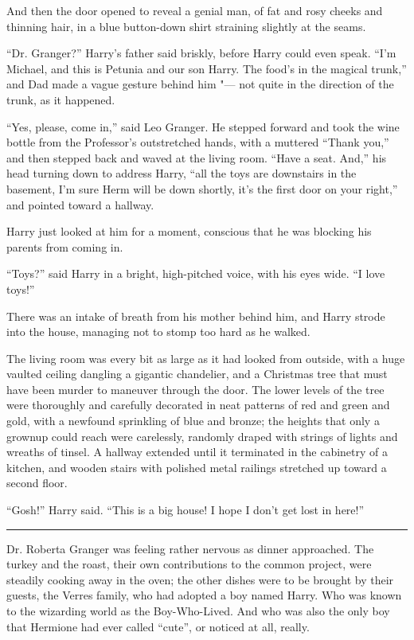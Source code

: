 And then the door opened to reveal a genial man, of fat and rosy cheeks
and thinning hair, in a blue button-down shirt straining slightly at the
seams.

``Dr. Granger?'' Harry's father said briskly, before Harry could even
speak. ``I'm Michael, and this is Petunia and our son Harry. The food's
in the magical trunk,'' and Dad made a vague gesture behind him "--- not
quite in the direction of the trunk, as it happened.

``Yes, please, come in,'' said Leo Granger. He stepped forward and took
the wine bottle from the Professor's outstretched hands, with a muttered
``Thank you,'' and then stepped back and waved at the living room.
``Have a seat. And,'' his head turning down to address Harry, ``all the
toys are downstairs in the basement, I'm sure Herm will be down shortly,
it's the first door on your right,'' and pointed toward a hallway.

Harry just looked at him for a moment, conscious that he was blocking
his parents from coming in.

``Toys?'' said Harry in a bright, high-pitched voice, with his eyes
wide. ``I love toys!''

There was an intake of breath from his mother behind him, and Harry
strode into the house, managing not to stomp too hard as he walked.

The living room was every bit as large as it had looked from outside,
with a huge vaulted ceiling dangling a gigantic chandelier, and a
Christmas tree that must have been murder to maneuver through the door.
The lower levels of the tree were thoroughly and carefully decorated in
neat patterns of red and green and gold, with a newfound sprinkling of
blue and bronze; the heights that only a grownup could reach were
carelessly, randomly draped with strings of lights and wreaths of
tinsel. A hallway extended until it terminated in the cabinetry of a
kitchen, and wooden stairs with polished metal railings stretched up
toward a second floor.

``Gosh!'' Harry said. ``This is a big house! I hope I don't get lost in
here!''

\begin{center}\rule{3in}{0.4pt}\end{center}

Dr. Roberta Granger was feeling rather nervous as dinner approached. The
turkey and the roast, their own contributions to the common project,
were steadily cooking away in the oven; the other dishes were to be
brought by their guests, the Verres family, who had adopted a boy named
Harry. Who was known to the wizarding world as the Boy-Who-Lived. And
who was also the only boy that Hermione had ever called ``cute'', or
noticed at all, really.

